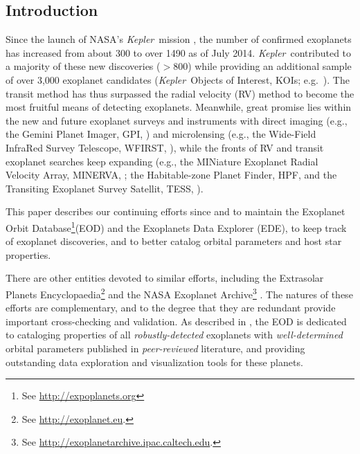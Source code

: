 \documentclass[11pt,preprint]{aastex}
\def\kepler{\textit{Kepler}}
\begin{document}
\begin{CJK*}{UTF8}{gbsn}
\section{Introduction}\label{sec:intro}

Since the launch of NASA's \kepler\ mission \citep{Borucki2010}, the
number of confirmed exoplanets has increased from about 300 to over
1490 as of July 2014. \kepler\ contributed to a majority of these new
discoveries ($> 800$) while providing an additional sample of over
3,000 exoplanet candidates (\kepler\ Objects of Interest, KOIs;
e.g.~\citealt{Batalha2013}). The transit method has thus surpassed the
radial velocity (RV) method to become the most fruitful means of
detecting exoplanets. Meanwhile, great promise lies within the new and
future exoplanet surveys and instruments with direct imaging (e.g.,
the Gemini Planet Imager, GPI, \citealt{Macintosh2014}) and
microlensing (e.g., the Wide-Field InfraRed Survey Telescope, WFIRST,
\citealt{Green2012}), while the fronts of RV and transit exoplanet
searches keep expanding (e.g., the MINiature Exoplanet Radial Velocity
Array, MINERVA, \citealt{Wright2014}; the Habitable-zone Planet Finder,
HPF, \citealt{Mahadevan2012} and the Transiting Exoplanet Survey
Satellit, TESS, \citealt{Ricker2014}).

This paper describes our continuing efforts since \cite{Butler2006}
and \cite{Wright2011} to maintain the Exoplanet Orbit
Database\footnote{See \url{http://expoplanets.org}}(EOD) and the
Exoplanets Data Explorer (EDE), to keep track of exoplanet
discoveries, and to better catalog orbital parameters and host star
properties.

There are other entities devoted to similar efforts,
including the Extrasolar Planets Encyclopaedia\footnote{See
  \url{http://exoplanet.eu}.}  \citep{Schneider2011} and the NASA
Exoplanet Archive\footnote{See
  \url{http://exoplanetarchive.ipac.caltech.edu}.}
\citep{Akeson2013}.  The natures of these efforts are complementary, and to the
degree that they are redundant provide important cross-checking and
validation.  As described in \cite{Wright2011}, the EOD is
dedicated to cataloging properties of all \emph{robustly-detected} exoplanets with
\emph{well-determined} orbital parameters published in
\emph{peer-reviewed} literature, and providing outstanding data
exploration and visualization tools for these planets.


\end{CJK*}
\end{document}
